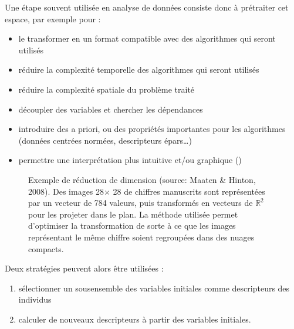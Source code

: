 \documentclass[letterpaper,10pt,french]{sphinxmanual}
\begin{document}
\sphinxAtStartPar
Une étape souvent utilisée en analyse de données consiste donc à prétraiter cet espace, par exemple pour :
\begin{itemize}
\item {} 
\sphinxAtStartPar
le transformer en un format compatible avec des algorithmes qui seront utilisés

\item {} 
\sphinxAtStartPar
réduire la complexité temporelle des algorithmes qui seront utilisés

\item {} 
\sphinxAtStartPar
réduire la complexité spatiale du problème traité

\item {} 
\sphinxAtStartPar
découpler des variables et chercher les dépendances

\item {} 
\sphinxAtStartPar
introduire des a priori, ou des propriétés importantes pour les algorithmes (données centrées normées, descripteurs épars…)

\item {} 
\sphinxAtStartPar
permettre une interprétation plus intuitive et/ou graphique ({\hyperref[\detokenize{selection:tsne}]{}})

\end{itemize}

\begin{figure}[htbp]
\centering
\capstart

\noindent{}
\caption{Exemple de réduction de dimension (source: Maaten \& Hinton, 2008). Des images 28\(\times\) 28 de chiffres manuscrits sont représentées par un vecteur de 784 valeurs, puis transformés en vecteurs de \(\mathbb{R}^2\) pour les projeter dans le plan. La méthode utilisée permet d’optimiser la transformation de sorte à ce que les images représentant le même chiffre soient regroupées dans des nuages compacts.}\label{\detokenize{selection:tsne}}\end{figure}

\sphinxAtStartPar
Deux stratégies peuvent alors être utilisées :
\begin{enumerate}
%
\item {} 
\sphinxAtStartPar
sélectionner un sous\sphinxhyphen{}ensemble des variables initiales comme descripteurs des individus

\item {} 
\sphinxAtStartPar
calculer de nouveaux descripteurs à partir des variables initiales.

\end{enumerate}
\end{document}
